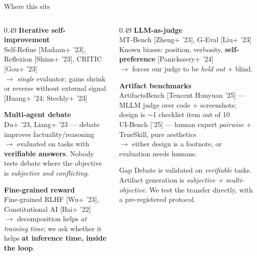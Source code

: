 \documentclass[aspectratio=169,10pt]{beamer}
\newcommand{\cit}[1]{{\scriptsize\color{gray60}[#1]}}
\newcommand{\hl}[1]{\textbf{\color{navymain}#1}}
\newcommand{\bad}[1]{\textbf{\color{accentred}#1}}
\begin{document}
\begin{frame}{Where this sits}
\scriptsize
\begin{columns}[T,onlytextwidth]
\begin{column}{0.49\textwidth}
\textbf{\color{navymain}Iterative self-improvement}\\
Self-Refine \cit{Madaan+ '23}, Reflexion \cit{Shinn+ '23}, CRITIC \cit{Gou+ '23}\\
$\rightarrow$ \emph{single} evaluator; gains shrink or reverse without external signal
\cit{Huang+ '24; Stechly+ '23}

\vspace{0.6em}
\textbf{\color{navymain}Multi-agent debate}\\
Du+ '23, Liang+ '23 --- debate improves factuality/reasoning\\
$\rightarrow$ evaluated on tasks with \bad{verifiable answers}.
Nobody tests debate where the objective is \emph{subjective and conflicting}.

\vspace{0.6em}
\textbf{\color{navymain}Fine-grained reward}\\
Fine-grained RLHF \cit{Wu+ '23}, Constitutional AI \cit{Bai+ '22}\\
$\rightarrow$ decomposition helps \emph{at training time}; we ask whether it helps
\hl{at inference time, inside the loop}.
\end{column}

\begin{column}{0.49\textwidth}
\textbf{\color{navymain}LLM-as-judge}\\
MT-Bench \cit{Zheng+ '23}, G-Eval \cit{Liu+ '23}\\
Known biases: position, verbosity, \bad{self-preference} \cit{Panickssery+ '24}\\
$\rightarrow$ forces our judge to be \emph{held out} + blind.

\vspace{0.6em}
\textbf{\color{navymain}Artifact benchmarks}\\
ArtifactsBench \cit{Tencent Hunyuan '25} --- MLLM judge over code + screenshots;
design is $\sim$1 checklist item out of 10\\
UI-Bench \cit{'25} --- human expert \emph{pairwise} + TrueSkill, pure aesthetics\\
$\rightarrow$ either design is a footnote, or evaluation needs humans.

\vspace{0.6em}
\begin{block}{\scriptsize Gap}
\scriptsize Debate is validated on \emph{verifiable} tasks.
Artifact generation is \emph{subjective + multi-objective}.
We test the transfer directly, with a pre-registered protocol.
\end{block}
\end{column}
\end{columns}
\end{frame}
\end{document}
